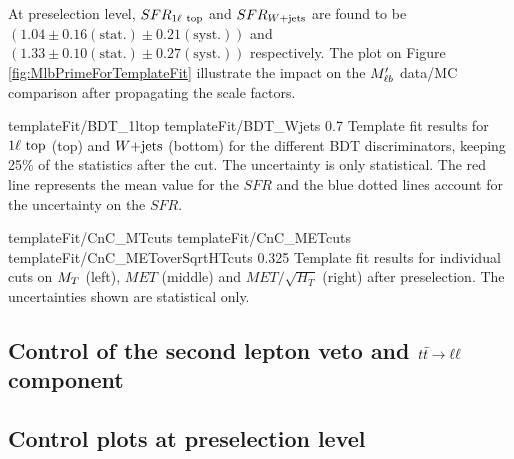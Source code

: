         At preselection level, $SFR_{1\ell~\text{top}}$ and $SFR_{\text{$W$+jets}}$ are found to be $(1.04 \pm 0.16 (\text{stat.}) \pm 0.21 (\text{syst.}))$ and $(1.33 \pm 0.10 (\text{stat.}) \pm 0.27 (\text{syst.}) )$ respectively. The plot on Figure \ref{fig:MlbPrimeForTemplateFit} illustrate the impact on the $M'_{\ell b}$ data/MC comparison after propagating the scale factors.


                          {templateFit/BDT_1ltop}
                          {templateFit/BDT_Wjets}
                          {0.7}
                          {Template fit results for $1\ell~\text{top}$ (top) and $\text{$W$+jets}$ (bottom) for the different BDT discriminators, keeping 25\% of the statistics after the cut. The uncertainty is only statistical. The red line represents the mean value for the $SFR$ and the blue dotted lines account for the uncertainty on the $SFR$.}

                           {templateFit/CnC_MTcuts}
                           {templateFit/CnC_METcuts}
                           {templateFit/CnC_METoverSqrtHTcuts}
                           {0.325}
                           {Template fit results for individual cuts on $M_T$ (left), $MET$ (middle) and $MET/\sqrt{H_T}$ (right) after preselection. The uncertainties shown are statistical only.}
        
        \subsection{Control of the second lepton veto and $t\bar{t} \rightarrow \ell \ell$ component}

        \subsection{Control plots at preselection level}


